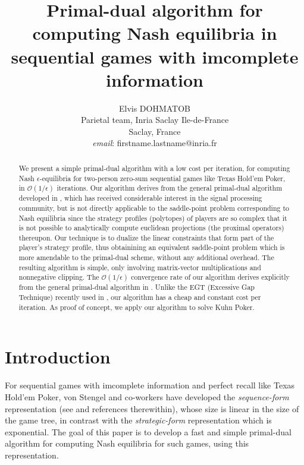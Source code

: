 \documentclass{article} %
\author{
Elvis DOHMATOB
\\
Parietal team, Inria Saclay Ile-de-France\\
Saclay, France\\
\textit{email}: firstname.lastname@inria.fr}
\title{Primal-dual algorithm for computing Nash equilibria in
sequential games with imcomplete information
}
\begin{document}
\maketitle

\begin{abstract}
We present a simple primal-dual algorithm with a low cost per iteration, for computing Nash $\epsilon$-equilibria for two-person zero-sum sequential games like Texas Hold'em Poker, in $\mathcal{O}(1/\epsilon)$ iterations. %
Our algorithm derives from the general primal-dual algorithm developed
in \cite{chambolle2010}, which has received considerable interest in the signal processing community, but is not directly applicable to the saddle-point problem corresponding to Nash equilibria since the strategy profiles (polytopes) of players are so complex that it is not possible
 to analytically compute
euclidean
 projections (the proximal operators) thereupon.
Our technique is to dualize the linear constraints that form part of the player's strategy profile, thus obtainining an equivalent saddle-point problem which is more amendable to the primal-dual scheme, without any additional overhead. The resulting algorithm is simple, only involving matrix-vector multiplications
and nonnegative clipping.
The $\mathcal{O}(1/\epsilon)$ convergence rate of our algorithm derives explicitly from the general primal-dual algorithm in \cite{chambolle2010}. Unlike the EGT (Excessive Gap Technique) recently used in \cite{hoda2010smoothing}, our algorithm has a cheap and constant cost per iteration. As proof of concept, we apply our algorithm to solve Kuhn Poker.
\end{abstract}

\section{Introduction}
\label{sec:intro}
For sequential games with imcomplete information and perfect recall like Texas Hold'em Poker, von Stengel and co-workers have developed the \textit{sequence-form} representation (see \cite{von1996efficient} and references therewithin), whose size is linear in the size of the game tree, in contrast with the \textit{strategic-form} representation which is exponential. The goal of this paper is to develop a fast and simple primal-dual algorithm for computing Nash equilibria for such games, using this representation.
\end{document}
